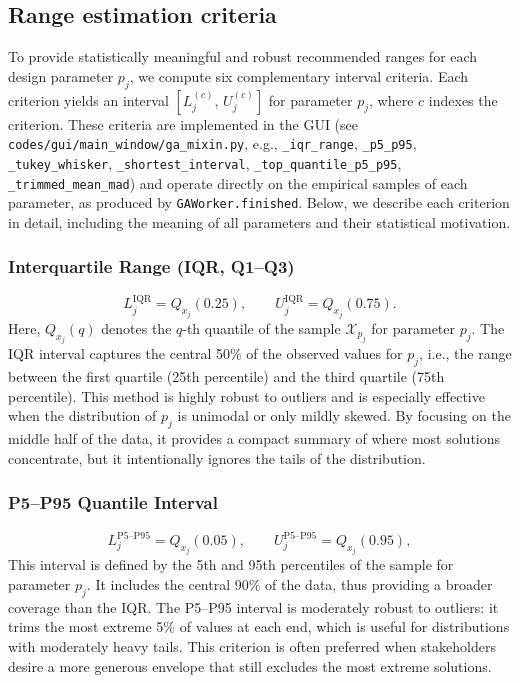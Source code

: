 \documentclass[12pt,a4paper]{article}
\begin{document}
\subsection{Range estimation criteria}
To provide statistically meaningful and robust recommended ranges for each design parameter $p_j$, we compute six complementary interval criteria. Each criterion yields an interval $[L^{(c)}_j,\,U^{(c)}_j]$ for parameter $p_j$, where $c$ indexes the criterion. These criteria are implemented in the GUI (see \texttt{codes/gui/main\_window/ga\_mixin.py}, e.g., \texttt{\_iqr\_range}, \texttt{\_p5\_p95}, \texttt{\_tukey\_whisker}, \texttt{\_shortest\_interval}, \texttt{\_top\_quantile\_p5\_p95}, \texttt{\_trimmed\_mean\_mad}) and operate directly on the empirical samples of each parameter, as produced by \texttt{GAWorker.finished}. Below, we describe each criterion in detail, including the meaning of all parameters and their statistical motivation.

\subsubsection{Interquartile Range (IQR, Q1--Q3)}
\vspace{-0.25em}
\begin{equation}
    L^{\text{IQR}}_j = Q_{x_j}(0.25), \qquad U^{\text{IQR}}_j = Q_{x_j}(0.75).
\end{equation}
Here, $Q_{x_j}(q)$ denotes the $q$-th quantile of the sample $\mathcal{X}_{p_j}$ for parameter $p_j$. The IQR interval captures the central 50\% of the observed values for $p_j$, i.e., the range between the first quartile (25th percentile) and the third quartile (75th percentile). This method is highly robust to outliers and is especially effective when the distribution of $p_j$ is unimodal or only mildly skewed. By focusing on the middle half of the data, it provides a compact summary of where most solutions concentrate, but it intentionally ignores the tails of the distribution.

\subsubsection{P5--P95 Quantile Interval}
\vspace{-0.25em}
\begin{equation}
    L^{\text{P5--P95}}_j = Q_{x_j}(0.05), \qquad U^{\text{P5--P95}}_j = Q_{x_j}(0.95),
\end{equation}
This interval is defined by the 5th and 95th percentiles of the sample for parameter $p_j$. It includes the central 90\% of the data, thus providing a broader coverage than the IQR. The P5--P95 interval is moderately robust to outliers: it trims the most extreme 5\% of values at each end, which is useful for distributions with moderately heavy tails. This criterion is often preferred when stakeholders desire a more generous envelope that still excludes the most extreme solutions.
\end{document}
